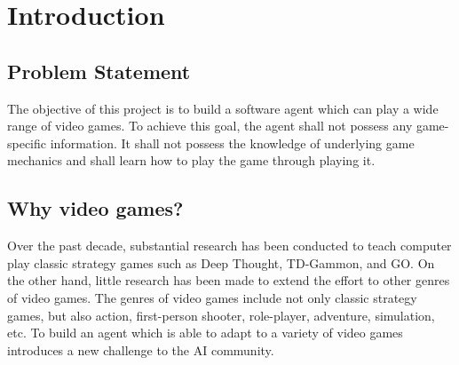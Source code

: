
\chapter{Introduction}
\label{ch:intro}

\section{Problem Statement}
\cbstart
The objective of this project is to build a software agent which can play a wide range 
of video games. To achieve this goal, the agent shall not possess any game-specific 
information. It shall not possess the knowledge of underlying game mechanics and shall
learn how to play the game through playing it. 
\cbend

\section{Why video games?}
Over the past decade, substantial research has been conducted to teach computer play classic strategy games such
as Deep Thought\cite{DeepBlue}, TD-Gammon\cite{Gammon}, and GO\cite{Go}.
On the other hand, little research has been made\cite{FPS}\cite{Mario} to extend the effort to other genres of video games.
The genres of video games include not only classic strategy games, but also action, first-person shooter, role-player, adventure, simulation, etc.
\cbstart
To build an agent which is able to adapt to a variety of video games introduces a new challenge to the AI community.
\cbend

